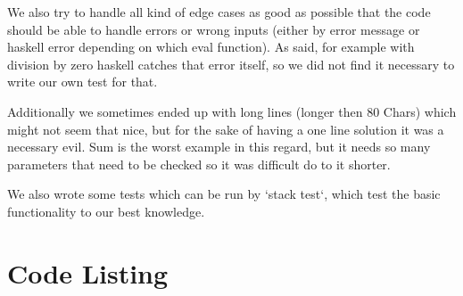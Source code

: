 \documentclass[12pt,a4paper]{article}
\begin{document}
We also try to handle all kind of edge cases as good as possible that the code should be able to handle errors or wrong inputs (either by error message or haskell error depending on which eval function). As said, for example with division by zero haskell catches that error itself, so we did not find it necessary to write our own test for that.

Additionally we sometimes ended up with long lines (longer then 80 Chars) which might not seem that nice, but for the sake of having a one line solution it was a necessary evil. Sum is the worst example in this regard, but it needs so many parameters that need to be checked so it was difficult do to it shorter.


We also wrote some tests which can be run by `stack test`, which test the basic functionality to our best knowledge.

\appendix
\section{Code Listing}

\inputminted{haskell}{src/Arithmetic.hs}
\end{document}
